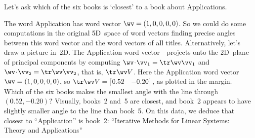 \begin{example} \label{eg:bks6q}
Let's ask which of the six books is `closest' to a book about Applications.
\begin{solution} 
The word Application has word vector \(\wv=(1,0,0,0,0)\).
So we could do some computations in the original 5D~space of word vectors finding precise angles between this word vector and the word vectors of all titles.
Alternatively, let's draw a picture in~2D.
The Application word vector~\wv\ projects onto the 2D~plane of principal components by computing \(\wv\cdot\vv_1=\tr\wv\vv_1\) and \(\wv\cdot\vv_2=\tr\wv\vv_2\), that is, \(\tr\wv V\).
Here the Application word vector \(\wv=(1,0,0,0,0)\), so \(\tr\wv V=\begin{bmatrix} 0.52 & -0.20 \end{bmatrix}\), as plotted in the margin.
Which of the six books makes the smallest angle with the line through \((0.52,-0.20)\)?
Visually, books~2 and~5 are closest, and book~2 appears to have slightly smaller angle to the line than book~5.
On this data, we deduce that closest to ``Application'' is book~2: ``Iterative Methods for Linear Systems: Theory and Applications''
\end{solution}
\end{example}






